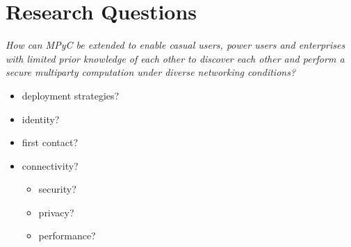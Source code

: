 \hypertarget{research-questions}{%
\chapter{Research Questions}\label{research-questions}}

\emph{How can MPyC be extended to enable casual users, power users and
enterprises with limited prior knowledge of each other to discover each
other and perform a secure multiparty computation under diverse
networking conditions?}

\begin{itemize}
\tightlist
\item
  deployment strategies?
\item
  identity?
\item
  first contact?
\item
  connectivity?

  \begin{itemize}
  \tightlist
  \item
    security?
  \item
    privacy?
  \item
    performance?
  \end{itemize}
\end{itemize}
